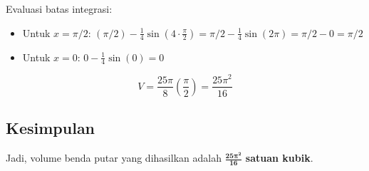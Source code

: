 Evaluasi batas integrasi:
\begin{itemize}
  \item Untuk $x = \pi/2$: $(\pi/2) - \frac{1}{4} \sin(4 \cdot \frac{\pi}{2}) = \pi/2 - \frac{1}{4} \sin(2\pi) = \pi/2 - 0 = \pi/2$
  \item Untuk $x = 0$: $0 - \frac{1}{4} \sin(0) = 0$
\end{itemize}

\[ V = \frac{25\pi}{8} \left( \frac{\pi}{2} \right) = \frac{25\pi^2}{16} \]

\subsection*{Kesimpulan}
Jadi, volume benda putar yang dihasilkan adalah $\mathbf{\frac{25\pi^2}{16}}$ \textbf{satuan kubik}.

